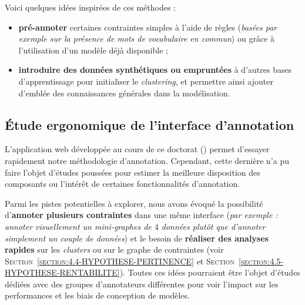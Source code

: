 		Voici quelques idées inspirées de ces méthodes :
		\begin{itemize}
			\item \textbf{pré-annoter} certaines contraintes simples à l'aide de règles (\textit{basées par exemple sur la présence de mots de vocabulaire en commun}) ou grâce à l'utilisation d'un modèle déjà disponible ; 
			\item \textbf{introduire des données synthétiques ou empruntées} à d'autres bases d'apprentissage pour initialiser le \textit{clustering}, et permettre ainsi ajouter d'emblée des connaissances générales dans la modélisation.
		\end{itemize}
	
	
	\subsection{Étude ergonomique de l'interface d'annotation}
	\label{section:4.7.5-HYPOTHESES-NON-VERIFIEES-ERGONOMIQUE}
	
		L'application web développée au cours de ce doctorat (\cite{schild-etal:2022:cognitivefactory-interactiveclusteringgui}) permet d'essayer rapidement notre méthodologie d'annotation.
		Cependant, cette dernière n'a pu faire l'objet d'études poussées pour estimer la meilleure disposition des composants ou l'intérêt de certaines fonctionnalités d'annotation.
		
		Parmi les pistes potentielles à explorer, nous avons évoqué la possibilité d'\textbf{annoter plusieurs contraintes} dans une même interface (\textit{par exemple : annoter visuellement un mini-graphes de $4$ données plutôt que d'annoter simplement un couple de données}) et le besoin de \textbf{réaliser des analyses rapides} sur les \textit{clusters} ou sur le graphe de contraintes (voir \textsc{Section~\ref{section:4.4-HYPOTHESE-PERTINENCE}} et \textsc{Section~\ref{section:4.5-HYPOTHESE-RENTABILITE}}).
		Toutes ces idées pourraient être l'objet d'études dédiées avec des groupes d'annotateurs différentes pour voir l'impact sur les performances et les biais de conception de modèles.